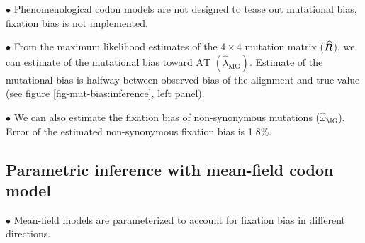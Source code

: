 $\bullet$ Phenomenological \gls{codon} models are not designed to tease out mutational bias, fixation bias is not implemented.

$\bullet$ From the maximum \gls{likelihood} estimates of the $4 \times 4$ mutation matrix ($\widehat{\bm{R}}$), we can estimate of the mutational bias toward $\mathrm{AT}$ $\left({\widehat{\lambda}_{\text{MG}}} \right)$.
Estimate of the mutational bias is halfway between observed bias of the alignment and true value (see figure \ref{fig-mut-bias:inference}, left panel).

$\bullet$ We can also estimate the fixation bias of non-synonymous mutations (${\widehat{\omega}_{\text{MG}}}$).
Error of the estimated non-synonymous fixation bias is 1.8\%.

\subsection{Parametric inference with mean-field {codon} model}

$\bullet$ Mean-field models are parameterized to account for fixation bias in different directions.

